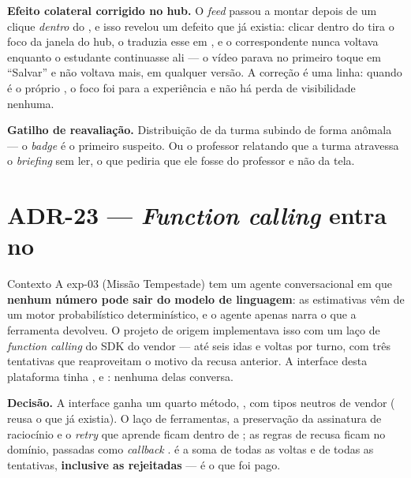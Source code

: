 \textbf{Efeito colateral corrigido no hub.} O \emph{feed} passou a montar depois
de um clique \emph{dentro} do , e isso revelou um defeito que já
existia: clicar dentro do  tira o foco da janela do hub, o
 traduzia esse  em , e o 
correspondente nunca voltava enquanto o estudante continuasse ali --- o vídeo parava
no primeiro toque em \enquote{Salvar} e não voltava mais, em qualquer versão. A
correção é uma linha: quando  é o próprio
, o foco foi para a experiência e não há perda de visibilidade
nenhuma.

\textbf{Gatilho de reavaliação.} Distribuição de  da turma
subindo de forma anômala --- o \emph{badge} é o primeiro suspeito. Ou o professor
relatando que a turma atravessa o \emph{briefing} sem ler, o que pediria que ele
fosse do professor e não da tela.

\section{ADR-23 --- \emph{Function calling} entra no }
\label{adr:ferramentas}

\begin{especificacao}{Contexto}
A exp-03 (Missão Tempestade) tem um agente conversacional em que \textbf{nenhum
número pode sair do modelo de linguagem}: as estimativas vêm de um motor
probabilístico determinístico, e o agente apenas narra o que a ferramenta
devolveu. O projeto de origem implementava isso com um laço de \emph{function
calling} do SDK do vendor --- até seis idas e voltas por turno, com três
tentativas que reaproveitam o motivo da recusa anterior. A interface
 desta plataforma tinha ,  e
: nenhuma delas conversa.
\end{especificacao}

\textbf{Decisão.} A interface ganha um quarto método, , com tipos
neutros de vendor ( reusa o  que já existia). O
laço de ferramentas, a preservação da assinatura de raciocínio e o \emph{retry}
que aprende ficam dentro de ; as regras de recusa ficam
no domínio, passadas como \emph{callback} .  é a
soma de todas as voltas e de todas as tentativas, \textbf{inclusive as
rejeitadas} --- é o que foi pago.

